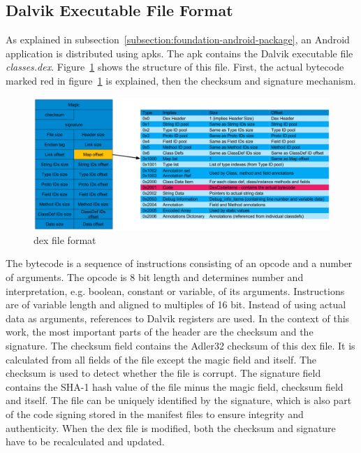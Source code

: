 \subsection{Dalvik Executable File Format} \label{subsection:android-dex}
As explained in subsection~\ref{subsection:foundation-android-package}, an Android application is distributed using \gls{apk}s.
The \gls{apk} contains the Dalvik executable file \textit{classes.dex}.
Figure~\ref{fig:dex} shows the structure of this file.
First, the actual bytecode marked red in figure~\ref{fig:dex} is explained, then the checksum and signature mechanism.
\newline
\begin{figure}[h]
    \centering
    \includegraphics[width=1\textwidth]{data/dex.png}
    \caption{\gls{dex} file format \cite{andevconDalvikART}}
    \label{fig:dex}
\end{figure}
The bytecode is a sequence of instructions consisting of an opcode and a number of arguments.
The opcode is 8 bit length and determines number and interpretation, e.g. boolean, constant or variable, of its arguments.
Instructions are of variable length and aligned to multiples of 16 bit.
Instead of using actual data as arguments, references to Dalvik registers are used. \cite{androidDalvik} \cite{opcodes}
\newline
In the context of this work, the most important parts of the header are the checksum and the signature.
The checksum field contains the Adler32 checksum of this \gls{dex} file.
It is calculated from all fields of the file except the magic field and itself.
The checksum is used to detect whether the file is corrupt.
The signature field contains the SHA-1 hash value of the file minus the magic field, checksum field and itself.
The file can be uniquely identified by the signature, which is also part of the code signing stored in the manifest files to ensure integrity and authenticity.
When the \gls{dex} file is modified, both the checksum and signature have to be recalculated and updated. \cite{developersDalvik} \cite{ehringerDalvik}
